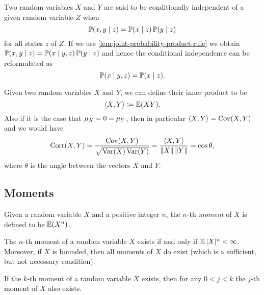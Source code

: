 \begin{definition}
\label{def:conditional-independence}
Two random variables \(X\) and \(Y\) are said to be conditionally independent of
a given random variable \(Z\) when
\[
\operatorname{\mathbb{P}}(x, y \mid z) = \operatorname{\mathbb{P}}(x \mid z) \operatorname{\mathbb{P}}(y \mid z)
\]
for all states \(z\) of \(Z\). If we use
\cref{lem:joint-probability-product-rule} we obtain \(\operatorname{\mathbb{P}}(x, y \mid z) =
\operatorname{\mathbb{P}}(x \mid y, z) \operatorname{\mathbb{P}}(y \mid z)\) and hence the conditional independence can
be reformulated as
\[
\operatorname{\mathbb{P}}(x \mid y, z) = \operatorname{\mathbb{P}}(x \mid z).
\]
\end{definition}

\begin{definition}
\label{def:inner-product-random-variables}
Given two random variables \(X\) and \(Y\), we can define their inner product to
be
\[
\langle X, Y \rangle \coloneq \operatorname{\mathbb{E}}(X Y).
\]
Also if it is the case that \(\mu_X = 0 = \mu_Y\), then in particular
\(\langle X, Y \rangle = \operatorname{Cov}(X, Y)\) and we would have
\[
\operatorname{Corr}(X, Y) = \frac{\operatorname{Cov}(X, Y)}{\sqrt{\operatorname{Var}(X) \operatorname{Var}(Y)}}
= \frac{\langle X, Y \rangle}{\| X \|\, \| Y \|} = \cos \theta,
\]
where \(\theta\) is the angle between the vectors \(X\) and \(Y\).
\end{definition}

\subsection{Moments}

\begin{definition}[Moment]
\label{def:moment-random-variable}
Given a random variable \(X\) and a positive integer \(n\), the \(n\)-th
\emph{moment} of \(X\) is defined to be \(\operatorname{\mathbb{E}}(X^n)\).
\end{definition}

\begin{corollary}
\label{cor:existence-of-rnd-variable-moment}
The \(n\)-th moment of a random variable \(X\) exists if and only if
\(\operatorname{\mathbb{E}} |X|^n < \infty\). Moreover, if \(X\) is bounded, then all moments of \(X\)
do exist (which is a sufficient, but not necessary condition).
\end{corollary}

\begin{corollary}
If the \(k\)-th moment of a random variable \(X\) exists, then for any \(0 < j <
k\) the \(j\)-th moment of \(X\) also exists.
\end{corollary}

